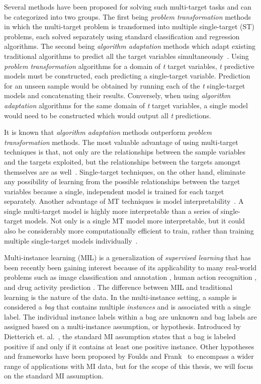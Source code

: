 \documentclass[reqno]{vcuthesis}
\numberwithin{equation}{chapter}
\begin{document}
Several methods have been proposed for solving such multi-target tasks and can be categorized into two groups. The first being \textit{problem transformation} methods in which the multi-target problem is transformed into multiple single-target (ST) problems, each solved separately using standard classification and regression algorithms. The second being \textit{algorithm adaptation} methods which adapt existing traditional algorithms to predict all the target variables simultaneously~\cite{Borchani2015}. Using \textit{problem transformation} algorithms for a domain of \textit{t} target variables, \textit{t} predictive models must be constructed, each predicting a single-target variable. Prediction for an unseen sample would be obtained by running each of the \textit{t} single-target models and concatenating their results. Conversely, when using \textit{algorithm adaptation} algorithms for the same domain of \textit{t} target variables, a single model would need to be constructed which would output all \textit{t} predictions.

It is known that \textit{algorithm adaptation} methods outperform \textit{problem transformation} methods. The most valuable advantage of using multi-target techniques is that, not only are the relationships between the sample variables and the targets exploited, but the relationships between the targets amongst themselves are as well~\cite{Baxter1997,Caruana1997}. Single-target techniques, on the other hand, eliminate any possibility of learning from the possible relationships between the target variables because a single, independent model is trained for each target separately. Another advantage of MT techniques is model interpretability~\cite{BenDavic2003}. A single multi-target model is highly more interpretable than a series of single-target models. Not only is a single MT model more interpretable, but it could also be considerably more computationally efficient to train, rather than training multiple single-target models individually~\cite{evgeniou2004regularized}. 

Multi-instance learning (MIL) is a generalization of \textit{supervised learning} that has been recently been gaining interest because of its applicability to many real-world problems such as image classification and annotation \cite{Herman2008}, human action recognition \cite{Yi2016}, and drug activity prediction \cite{Dietterich1997}. The difference between MIL and traditional learning is the nature of the data. In the multi-instance setting, a sample is considered a \textit{bag} that contains multiple \textit{instances} and is associated with a single label. The individual instance labels within a bag are unknown and bag labels are assigned based on a multi-instance assumption, or hypothesis. Introduced by Dietterich et. al.~\cite{Dietterich1997}, the standard MI assumption states that a bag is labeled positive if and only if it contains at least one positive instance. Other hypotheses and frameworks have been proposed by Foulds and Frank~\cite{Foulds2010} to encompass a wider range of applications with MI data, but for the scope of this thesis, we will focus on the standard MI assumption.
\end{document}
